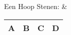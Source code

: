 Een Hoop Stenen: &
\begin{tabular}{|c|c|c|c|}
	\hline 
	\textbf{A} & \textbf{B} & \textbf{C} & \textbf{D} \\
	\hline 
\end{tabular} \\